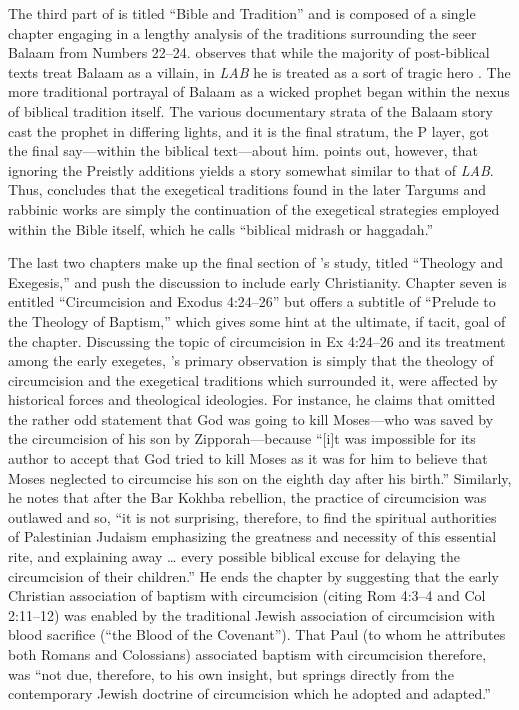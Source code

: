 The third part of  is titled ``Bible and Tradition'' and is composed of a single chapter engaging in a lengthy analysis of the traditions surrounding the seer Balaam from Numbers 22--24. \vermes observes that while the majority of post-biblical texts treat Balaam as a villain, in \emph{LAB} he is treated as a sort of tragic hero \autocite[173]{vermes1961}. The more traditional portrayal of Balaam as a wicked prophet began within the nexus of biblical tradition itself. The various documentary strata of the Balaam story cast the prophet in differing lights, and it is the final stratum, the P layer, got the final say---within the biblical text---about him. \vermes points out, however, that ignoring the Preistly additions yields a story somewhat similar to that of \emph{LAB}. Thus, \vermes concludes that the exegetical traditions found in the later Targums and rabbinic works are simply the continuation of the exegetical strategies employed within the Bible itself, which he calls ``biblical midrash or haggadah.'' \autocite[176]{vermes1961}

The last two chapters make up the final section of \vermes's study, titled ``Theology and Exegesis,'' and push the discussion to include early Christianity. Chapter seven is entitled ``Circumcision and Exodus 4:24--26'' but offers a subtitle of ``Prelude to the Theology of Baptism,'' which gives some hint at the ultimate, if tacit, goal of the chapter. Discussing the topic of circumcision in Ex 4:24--26 and its treatment among the early exegetes, \vermes's primary observation is simply that the theology of circumcision and the exegetical traditions which surrounded it, were affected by historical forces and theological ideologies. For instance, he claims that \jub omitted the rather odd statement that God was going to kill Moses---who was saved by the circumcision of his son by Zipporah---because ``[i]t was impossible for its author to accept that God tried to kill Moses as it was for him to believe that Moses neglected to circumcise his son on the eighth day after his birth.''\autocite[185]{vermes1961} Similarly, he notes that after the Bar Kokhba rebellion, the practice of circumcision was outlawed and so, ``it is not surprising, therefore, to find the spiritual authorities of Palestinian Judaism emphasizing the greatness and necessity of this essential rite, and explaining away \ldots{} every possible biblical excuse for delaying the circumcision of their children.''\autocite[189]{vermes1961} He ends the chapter by suggesting that the early Christian association of baptism with circumcision (citing Rom 4:3--4 and Col 2:11--12) was enabled by the traditional Jewish association of circumcision with blood sacrifice (``the Blood of the Covenant'')\autocite[190]{vermes1961}. That Paul (to whom he attributes both Romans and Colossians) associated baptism with circumcision therefore, was ``not due, therefore, to his own insight, but springs directly from the contemporary Jewish doctrine of circumcision which he adopted and adapted.''\autocite[191]{vermes1961} 

